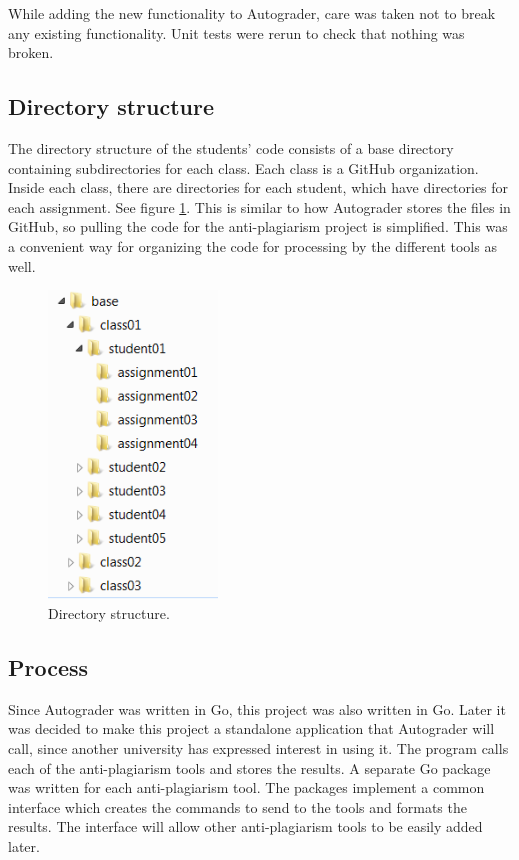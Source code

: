 \documentclass[10pt,journal,compsoc]{IEEEtran}
\begin{document}
		While adding the new functionality to Autograder, care was taken not to break any existing functionality. Unit tests were rerun to check that nothing was broken.
		
		\subsection{Directory structure}
		The directory structure of the students' code consists of a base directory containing subdirectories for each class. Each class is a GitHub organization. Inside each class, there are directories for each student, which have directories for each assignment. See figure \ref{fig:directories}. This is similar to how Autograder stores the files in GitHub, so pulling the code for the anti-plagiarism project is simplified. This was a convenient way for organizing the code for processing by the different tools as well.
		
		\begin{figure}[h!]
			\includegraphics[width=0.4\textwidth]{Directories.png}
			\caption{Directory structure.}
			\label{fig:directories}
		\end{figure}

		\subsection{Process}
		Since Autograder was written in Go, this project was also written in Go. Later it was decided to make this project a standalone application that Autograder will call, since another university has expressed interest in using it. The program calls each of the anti-plagiarism tools and stores the results. A separate Go package was written for each anti-plagiarism tool. The packages implement a common interface which creates the commands to send to the tools and formats the results. The interface will allow other anti-plagiarism tools to be easily added later.
		
\end{document}
